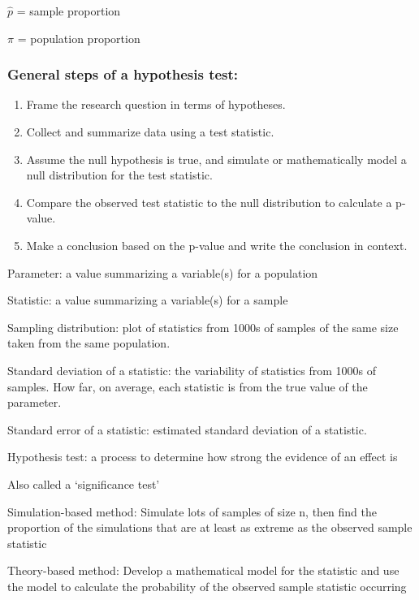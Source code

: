 \documentclass[
]{report}
\newcommand{\rgi}{\hspace{24pt}}  %
\begin{document}
\(\hat{p}\) = sample proportion

\(\pi\) = population proportion

\hypertarget{general-steps-of-a-hypothesis-test}{%
\subsubsection*{General steps of a hypothesis test:}\label{general-steps-of-a-hypothesis-test}}

\begin{enumerate}
\def\labelenumi{\arabic{enumi}.}
\item
  Frame the research question in terms of hypotheses.
\item
  Collect and summarize data using a test statistic.
\item
  Assume the null hypothesis is true, and simulate or mathematically model a null distribution for the test statistic.
\item
  Compare the observed test statistic to the null distribution to calculate a p-value.
\item
  Make a conclusion based on the p-value and write the conclusion in context.
\end{enumerate}

Parameter: a value summarizing a variable(s) for a population

Statistic: a value summarizing a variable(s) for a sample

Sampling distribution: plot of statistics from 1000s of samples of the same size taken from the same population.

Standard deviation of a statistic: the variability of statistics from 1000s of samples. How far, on average, each statistic is from the true value of the parameter.

Standard error of a statistic: estimated standard deviation of a statistic.

Hypothesis test: a process to determine how strong the evidence of an effect is

\rgi Also called a `significance test'

Simulation-based method: Simulate lots of samples of size n, then find the proportion of the simulations that are at least as extreme as the observed sample statistic

Theory-based method: Develop a mathematical model for the statistic and use the model to calculate the probability of the observed sample statistic occurring
\end{document}

